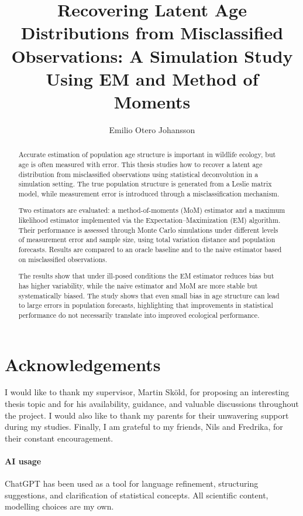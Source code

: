 \documentclass[11pt,a4paper]{article}
\title{Recovering Latent Age Distributions from Misclassified Observations: A Simulation Study Using EM and Method of Moments}
\author{Emilio Otero Johansson}
\begin{document}
\maketitle

\begin{abstract}
Accurate estimation of population age structure is important in wildlife ecology, but age is often measured with error. This thesis studies how to recover a latent age distribution from misclassified observations using statistical deconvolution in a simulation setting. The true population structure is generated from a Leslie matrix model, while measurement error is introduced through a misclassification mechanism.

Two estimators are evaluated: a method-of-moments (MoM) estimator and a maximum likelihood estimator implemented via the Expectation--Maximization (EM) algorithm. Their performance is assessed through Monte Carlo simulations under different levels of measurement error and sample size, using total variation distance and population forecasts. Results are compared to an oracle baseline and to the naive estimator based on misclassified observations.

The results show that under ill-posed conditions the EM estimator reduces bias but has higher variability, while the naive estimator and MoM are more stable but systematically biased. The study shows that even small bias in age structure can lead to large errors in population forecasts, highlighting that improvements in statistical performance do not necessarily translate into improved ecological performance.
\end{abstract}

\section*{Acknowledgements}

I would like to thank my supervisor, Martin Sköld, for proposing an interesting thesis topic and for his availability, guidance, and valuable discussions throughout the project. I would also like to thank my parents for their unwavering support during my studies. Finally, I am grateful to my friends, Nils and Fredrika, for their constant encouragement.

\paragraph{AI usage}
ChatGPT has been used as a tool for language refinement, structuring suggestions, and clarification of statistical concepts. All scientific content, modelling choices are my own.
\end{document}
